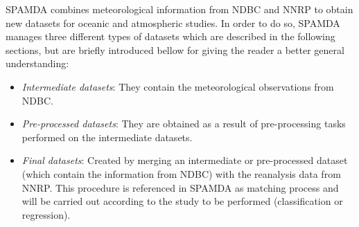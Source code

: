 \documentclass[energies,article,submit,moreauthors,pdftex]{Definitions/mdpi}
\begin{document}
		SPAMDA combines  meteorological information from NDBC and NNRP to obtain new datasets for oceanic and atmospheric studies. In order to do so, SPAMDA manages three different types of datasets which are described in the following sections, but are briefly introduced bellow for giving the reader a better general understanding:
			\begin{itemize}
				\item \textit{Intermediate datasets}: They contain the meteorological observations from NDBC.
				\item \textit{Pre-processed datasets}: They are obtained as a result of pre-processing tasks performed on the intermediate datasets.
				\item \textit{Final datasets}: Created by merging an intermediate or pre-processed dataset (which contain the information from NDBC) with the reanalysis data from NNRP. This procedure is referenced in SPAMDA as matching process and will be carried out according to the study to be performed (classification or regression).
			\end{itemize}
		
\end{document}
